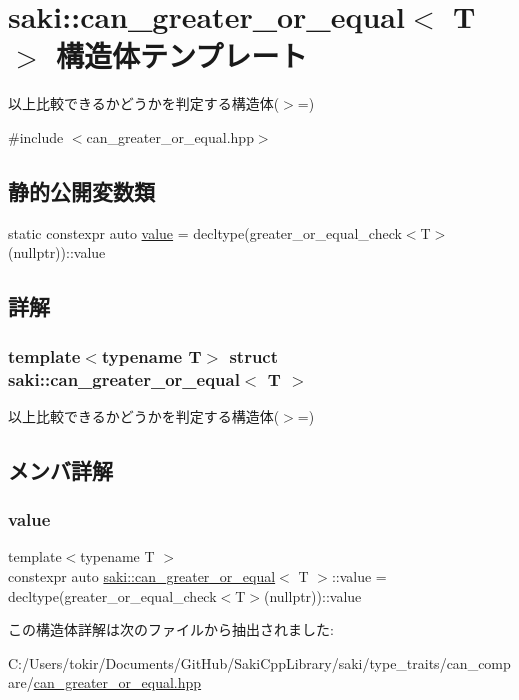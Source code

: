 \hypertarget{structsaki_1_1can__greater__or__equal}{}\section{saki\+:\+:can\+\_\+greater\+\_\+or\+\_\+equal$<$ T $>$ 構造体テンプレート}
\label{structsaki_1_1can__greater__or__equal}


以上比較できるかどうかを判定する構造体($>$=)  




{\ttfamily \#include $<$can\+\_\+greater\+\_\+or\+\_\+equal.\+hpp$>$}

\subsection*{静的公開変数類}
\begin{DoxyCompactItemize}
\item 
static constexpr auto \mbox{\hyperlink{structsaki_1_1can__greater__or__equal_a33bdce8a91412add2b2c1a3f4635fb31}{value}} = decltype(greater\+\_\+or\+\_\+equal\+\_\+check$<$T$>$(nullptr))\+::value
\end{DoxyCompactItemize}


\subsection{詳解}
\subsubsection*{template$<$typename T$>$\newline
struct saki\+::can\+\_\+greater\+\_\+or\+\_\+equal$<$ T $>$}

以上比較できるかどうかを判定する構造体($>$=) 

\subsection{メンバ詳解}
\mbox{\label{structsaki_1_1can__greater__or__equal_a33bdce8a91412add2b2c1a3f4635fb31}} 
\subsubsection{\texorpdfstring{value}{value}}
{\footnotesize\ttfamily template$<$typename T $>$ \\
constexpr auto \mbox{\hyperlink{structsaki_1_1can__greater__or__equal}{saki\+::can\+\_\+greater\+\_\+or\+\_\+equal}}$<$ T $>$\+::value = decltype(greater\+\_\+or\+\_\+equal\+\_\+check$<$T$>$(nullptr))\+::value\hspace{0.3cm}{\ttfamily [static]}}



この構造体詳解は次のファイルから抽出されました\+:\begin{DoxyCompactItemize}
\item 
C\+:/\+Users/tokir/\+Documents/\+Git\+Hub/\+Saki\+Cpp\+Library/saki/type\+\_\+traits/can\+\_\+compare/\mbox{\hyperlink{can__greater__or__equal_8hpp}{can\+\_\+greater\+\_\+or\+\_\+equal.\+hpp}}\end{DoxyCompactItemize}
